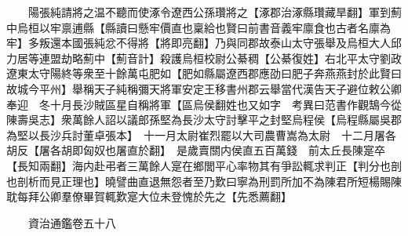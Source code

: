 　　陽張純請將之温不聽而使涿令遼西公孫瓚將之【涿郡治涿縣瓚藏旱翻】軍到薊中烏桓以牢禀逋縣【縣讀曰懸牢價直也稟給也賢曰前書音義牢廪食也古者名廪為牢】多叛還本國張純忿不得將【將即亮翻】乃與同郡故泰山太守張舉及烏桓大人邱力居等連盟劫略薊中【薊音計】殺護烏桓校尉公綦稠【公綦復姓】右北平太守劉政遼東太守陽終等衆至十餘萬屯肥如【肥如縣屬遼西郡應劭曰肥子奔燕燕封於此賢曰故城今平州】舉稱天子純稱彌天將軍安定王移書州郡云舉當代漢告天子避位敕公卿奉迎　冬十月長沙賊區星自稱將軍【區烏侯翻姓也又如字　考異曰范書作觀鵠今從陳壽吳志】衆萬餘人詔以議郎孫堅為長沙太守討擊平之封堅烏程侯【烏程縣屬吳郡為堅以長沙兵討董卓張本】　十一月太尉崔烈罷以大司農曹嵩為太尉　十二月屠各胡反【屠各胡即匈奴也屠直於翻】　是歲賣關内侯直五百萬錢　前太丘長陳寔卒【長知兩翻】海内赴弔者三萬餘人寔在鄉閭平心率物其有爭訟輒求判正【判分也剖也剖析而見正理也】曉譬曲直退無怨者至乃歎曰寧為刑罰所加不為陳君所短楊賜陳耽每拜公卿羣僚畢賀輒歎寔大位未登愧於先之【先悉薦翻】

　　資治通鑑卷五十八


    


 


 



 

 
  







 


　　
　　
　
　
　


　　

　















	
	










































